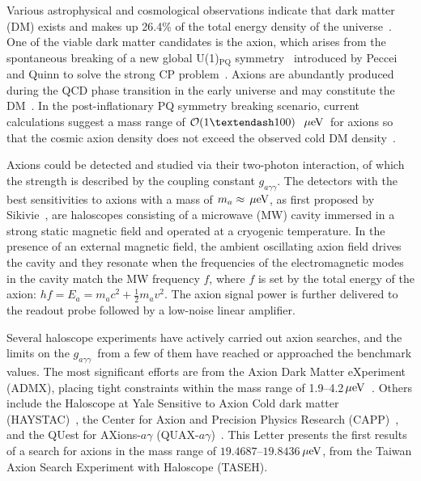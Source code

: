 \documentclass[%
 reprint,prl, %
superscriptaddress,
nobibnotes,
 amsmath,amssymb,
 aps,
]{revtex4-2}
\newcommand{\bgagg}{\ensuremath{g_{a\gamma\gamma}}}
\newcommand{\ma}{\ensuremath{m_a}}
\newcommand{\muevcc}{\ensuremath{\,\mu\text{e\hspace{-.08em}V}}}
\newcommand{\mlo}{\ensuremath{19.4687}}
\newcommand{\mhi}{\ensuremath{19.8436}}
\begin{document}
Various astrophysical and cosmological observations indicate that dark matter 
(DM) exists and makes up 26.4\% of the total energy density of the 
universe~\cite{DMI,DMII,DMIII,DMIV,PDG}. One of the viable dark matter 
candidates is the axion, which arises from the spontaneous breaking of a new 
global U(1)$_\mathrm{PQ}$ symmetry~\cite{strongCPI}  
introduced by Peccei and Quinn to solve the strong CP 
problem~\cite{strongCPI,strongCPII,strongCPIII}. 
Axions are abundantly produced during the QCD phase transition in 
the early universe and may constitute the 
DM~\cite{ADDONI,ADDONII,ADDONIII,ADDONIV}. 
In the post-inflationary PQ symmetry breaking scenario, 
current calculations suggest a mass range of 
${\cal O}(1–100)$~\muevcc\ for axions so that the cosmic axion density does 
not exceed the 
observed cold DM density~\cite{QCDCalI,QCDCalII,QCDCalIII,QCDCalIV,QCDCalV,QCDCalVI,QCDCalVII,QCDCalVIII,QCDCalIX,QCDCalX,QCDCalXI,QCDCalXII,QCDCalXIII}. 
%

Axions could be detected and studied via their two-photon interaction, 
of which the strength is described by the coupling constant \bgagg. 
The detectors with the best sensitivities to axions with a mass of 
$\ma\approx \muevcc$, as first proposed by 
Sikivie~\cite{SikivieI,SikivieII},  
are haloscopes consisting of a microwave (MW) cavity immersed in a strong static 
magnetic field and operated at a cryogenic temperature. 
In the presence of an external magnetic field, the ambient oscillating axion 
field drives the cavity and they resonate when the frequencies of the 
electromagnetic 
modes in the cavity match the MW frequency $f$, where $f$ is set by 
the total energy of the axion: $hf=E_a=\ma c^2 + \frac{1}{2}\ma v^2$. The 
axion signal power is further delivered 
to the readout probe followed by a low-noise linear amplifier. 

Several haloscope experiments have actively carried out axion searches, and 
the limits on the \bgagg\ from a few of them have 
reached or approached the benchmark values. The most significant efforts 
are from the Axion Dark Matter 
eXperiment (ADMX), placing tight constraints within the mass range of 
1.9--4.2\muevcc~\cite{ADMXI,ADMXII,ADMXIII,ADMXIV,ADMXV,ADMXVI,ADMXVII}. 
Others include the Haloscope at Yale Sensitive to Axion Cold dark matter 
(HAYSTAC)~\cite{HAYSTACIII,HAYSTACIV,HAYSTACI}, the Center 
for Axion and Precision Physics Research (CAPP)~\cite{CAPPII,CAPPIII,CAPPI}, 
and the QUest for AXions-$a\gamma$ (QUAX-$a\gamma$)~\cite{QUAX}. 
%
This Letter presents the first results 
of a search for axions in the mass range of \mlo--\mhi\muevcc, 
from the Taiwan Axion Search Experiment with Haloscope (TASEH). 
\end{document}

